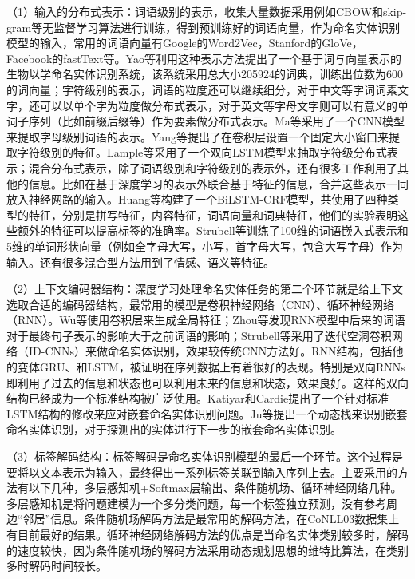 \documentclass[winfonts,master,oneside,nobackinfo]{njuthesis}
\begin{document}
（1）输入的分布式表示：词语级别的表示\cite{Nguyen}，收集大量数据采用例如CBOW和skip-gram等无监督学习算法进行训练，得到预训练好的词语向量，作为命名实体识别模型的输入，常用的词语向量有Google的Word2Vec，Stanford的GloVe，Facebook的fastText等。Yao等\cite{Yao}利用这种表示方法提出了一个基于词与向量表示的生物以学命名实体识别系统，该系统采用总大小205924的词典，训练出位数为600的词向量；字符级别的表示，词语的粒度还可以继续细分\cite{Kuru}，对于中文等字词词素文字，还可以以单个字为粒度做分布式表示，对于英文等字母文字则可以有意义的单词子序列（比如前缀后缀等）作为要素做分布式表示。Ma等\cite{Ma}采用了一个CNN模型来提取字母级别词语的表示。Yang等\cite{Yang}提出了在卷积层设置一个固定大小窗口来提取字符级别的特征。Lample等\cite{Lample}采用了一个双向LSTM模型来抽取字符级分布式表示；混合分布式表示，除了词语级别和字符级别的表示外，还有很多工作利用了其他的信息。比如在基于深度学习的表示外联合基于特征的信息，合并这些表示一同放入神经网路的输入。Huang等\cite{Huang}构建了一个BiLSTM-CRF模型，共使用了四种类型的特征，分别是拼写特征，内容特征，词语向量和词典特征，他们的实验表明这些额外的特征可以提高标签的准确率。Strubell等\cite{Strubell}训练了100维的词语嵌入式表示和5维的单词形状向量（例如全字母大写，小写，首字母大写，包含大写字母）作为输入。还有很多混合型方法用到了情感、语义\cite{Jansson}等特征。

（2）上下文编码器结构：深度学习处理命名实体任务的第二个环节就是给上下文选取合适的编码器结构，最常用的模型是卷积神经网络（CNN）、循环神经网络（RNN）。Wu等\cite{Wu}使用卷积层来生成全局特征；Zhou等\cite{zhou}发现RNN模型中后来的词语对于最终句子表示的影响大于之前词语的影响；Strubell\cite{Strubell}等采用了迭代空洞卷积网络（ID-CNNs）来做命名实体识别，效果较传统CNN方法好。RNN结构，包括他的变体GRU、和LSTM，被证明在序列数据上有着很好的表现。特别是双向RNNs\cite{Huang}即利用了过去的信息和状态也可以利用未来的信息和状态，效果良好。这样的双向结构已经成为一个标准结构被广泛使用。Katiyar和Cardie\cite{Katiyar}提出了一个针对标准LSTM结构的修改来应对嵌套命名实体识别问题。Ju等\cite{Ju}提出一个动态栈来识别嵌套命名实体识别，对于探测出的实体进行下一步的嵌套命名实体识别。

（3）标签解码结构：标签解码是命名实体识别模型的最后一个环节。这个过程是要将以文本表示为输入，最终得出一系列标签关联到输入序列上去。主要采用的方法有以下几种，多层感知机+Softmax层输出\cite{Strubell}、条件随机场\cite{Huang}、循环神经网络\cite{Shen}几种。多层感知机是将问题建模为一个多分类问题，每一个标签独立预测，没有参考周边“邻居”信息。条件随机场解码方法是最常用的解码方法，在CoNLL03数据集上有目前最好的结果\cite{Akbik}。循环神经网络解码方法的优点是\cite{Shen}当命名实体类别较多时，解码的速度较快，因为条件随机场的解码方法采用动态规划思想的维特比算法，在类别多时解码时间较长。
\end{document}
